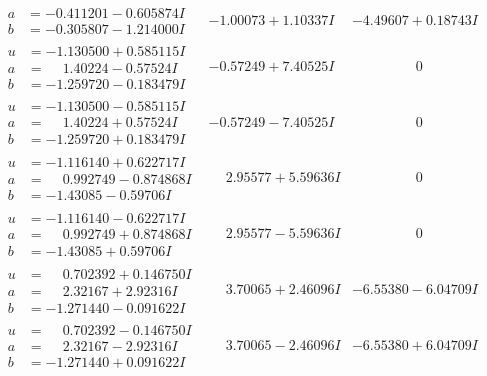 \documentclass[1p]{elsarticle_modified}
\theoremstyle{definition}
\begin{document}
$$\begin{array}{c|c|c}
\begin{aligned}
a &= -0.411201 - 0.605874 I \\
b &= -0.305807 - 1.214000 I\end{aligned}
 & -1.00073 + 1.10337 I & -4.49607 + 0.18743 I \\ \hline\begin{aligned}
u &= -1.130500 + 0.585115 I \\
a &= \phantom{-}1.40224 - 0.57524 I \\
b &= -1.259720 - 0.183479 I\end{aligned}
 & -0.57249 + 7.40525 I & \phantom{-0.000000 } 0 \\ \hline\begin{aligned}
u &= -1.130500 - 0.585115 I \\
a &= \phantom{-}1.40224 + 0.57524 I \\
b &= -1.259720 + 0.183479 I\end{aligned}
 & -0.57249 - 7.40525 I & \phantom{-0.000000 } 0 \\ \hline\begin{aligned}
u &= -1.116140 + 0.622717 I \\
a &= \phantom{-}0.992749 - 0.874868 I \\
b &= -1.43085 - 0.59706 I\end{aligned}
 & \phantom{-}2.95577 + 5.59636 I & \phantom{-0.000000 } 0 \\ \hline\begin{aligned}
u &= -1.116140 - 0.622717 I \\
a &= \phantom{-}0.992749 + 0.874868 I \\
b &= -1.43085 + 0.59706 I\end{aligned}
 & \phantom{-}2.95577 - 5.59636 I & \phantom{-0.000000 } 0 \\ \hline\begin{aligned}
u &= \phantom{-}0.702392 + 0.146750 I \\
a &= \phantom{-}2.32167 + 2.92316 I \\
b &= -1.271440 - 0.091622 I\end{aligned}
 & \phantom{-}3.70065 + 2.46096 I & -6.55380 - 6.04709 I \\ \hline\begin{aligned}
u &= \phantom{-}0.702392 - 0.146750 I \\
a &= \phantom{-}2.32167 - 2.92316 I \\
b &= -1.271440 + 0.091622 I\end{aligned}
 & \phantom{-}3.70065 - 2.46096 I & -6.55380 + 6.04709 I\\

\end{array}$$
\end{document}
